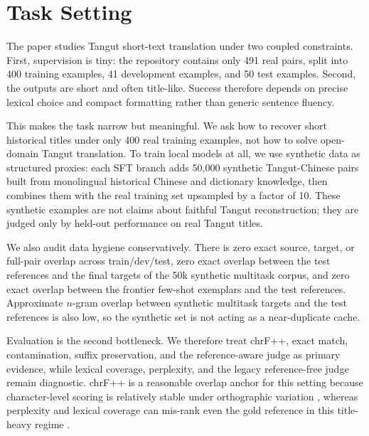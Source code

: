 \section{Task Setting}

The paper studies Tangut short-text translation under two coupled constraints. First, supervision is tiny: the repository contains only 491 real pairs, split into 400 training examples, 41 development examples, and 50 test examples. Second, the outputs are short and often title-like. Success therefore depends on precise lexical choice and compact formatting rather than generic sentence fluency.

This makes the task narrow but meaningful. We ask how to recover short historical titles under only 400 real training examples, not how to solve open-domain Tangut translation. To train local models at all, we use synthetic data as structured proxies: each SFT branch adds 50,000 synthetic Tangut-Chinese pairs built from monolingual historical Chinese and dictionary knowledge, then combines them with the real training set upsampled by a factor of 10. These synthetic examples are not claims about faithful Tangut reconstruction; they are judged only by held-out performance on real Tangut titles.

We also audit data hygiene conservatively. There is zero exact source, target, or full-pair overlap across train/dev/test, zero exact overlap between the test references and the final targets of the 50k synthetic multitask corpus, and zero exact overlap between the frontier few-shot exemplars and the test references. Approximate $n$-gram overlap between synthetic multitask targets and the test references is also low, so the synthetic set is not acting as a near-duplicate cache.

Evaluation is the second bottleneck. We therefore treat chrF++, exact match, contamination, suffix preservation, and the reference-aware judge as primary evidence, while lexical coverage, perplexity, and the legacy reference-free judge remain diagnostic. chrF++ is a reasonable overlap anchor for this setting because character-level scoring is relatively stable under orthographic variation \cite{popovic2017chrfpp}, whereas perplexity and lexical coverage can mis-rank even the gold reference in this title-heavy regime \cite{rei2020comet, kepler2019openkiwi, zouhar2024cometpitfalls, pombal2025mint}.
